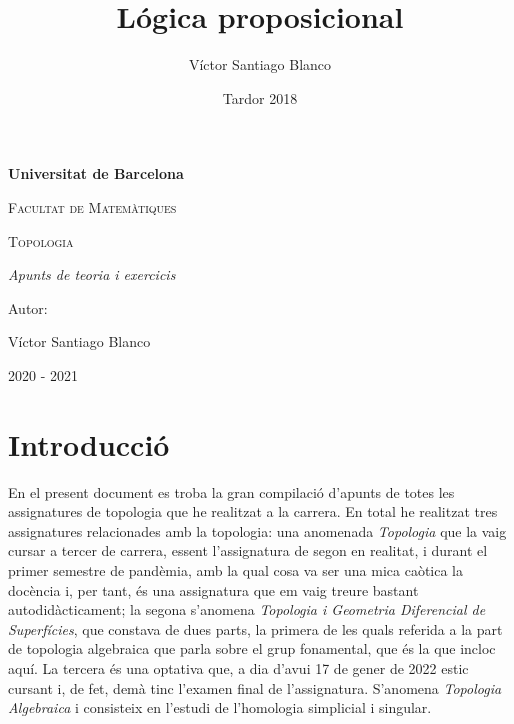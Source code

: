 \documentclass[titlepage, main=catalan, 11pt]{book}
\title{Lógica proposicional}
\author{Víctor Santiago Blanco}
\date{Tardor 2018}
\theoremstyle{definition}
\theoremstyle{plain}
\theoremstyle{remark}
\begin{document}





\begin{titlepage}
    \centering
    {\bfseries\LARGE Universitat de Barcelona \par}
    \vspace{1cm}
    {\scshape\Large Facultat de Matemàtiques \par}
    \vspace{3cm}
    {\scshape\Huge Topologia \par}
    \vspace{3cm}
    {\itshape\Large Apunts de teoria i exercicis \par}
    \vfill
    {\Large Autor: \par}
    {\Large Víctor Santiago Blanco \par}
    \vfill
    {\Large 2020 - 2021 \par}
    \end{titlepage}

\newpage



\tableofcontents
\newpage







\setcounter{section}{-1}

\chapter*{Introducció}

En el present document es troba la gran compilació d'apunts de totes les assignatures de topologia que he realitzat a la carrera. En total he realitzat tres assignatures relacionades amb la topologia: una anomenada \textit{Topologia} que la vaig cursar a tercer de carrera, essent l'assignatura de segon en realitat, i durant el primer semestre de pandèmia, amb la qual cosa va ser una mica caòtica la docència i, per tant, és una assignatura que em vaig treure bastant autodidàcticament; la segona s'anomena \textit{Topologia i Geometria Diferencial de Superfícies}, que constava de dues parts, la primera de les quals referida a la part de topologia algebraica que parla sobre el grup fonamental, que és la que incloc aquí. La tercera és una optativa que, a dia d'avui 17 de gener de 2022 estic cursant i, de fet, demà tinc l'examen final de l'assignatura. S'anomena \textit{Topologia Algebraica} i consisteix en l'estudi de l'homologia simplicial i singular.
\end{document}

